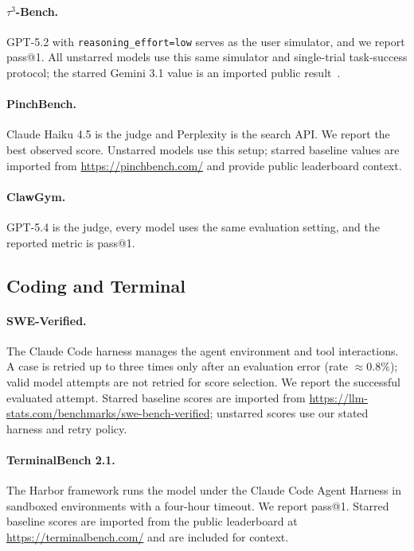 \paragraph{$\tau^3$-Bench.} GPT-5.2 with \texttt{reasoning\_effort=low} serves as the user simulator, and we report pass@1. All unstarred models use this same simulator and single-trial task-success protocol; the starred Gemini 3.1 value is an imported public result~\citep{macaron_v1_preview2026}.

\paragraph{PinchBench.} Claude Haiku 4.5 is the judge and Perplexity is the search API. We report the best observed score. Unstarred models use this setup; starred baseline values are imported from \url{https://pinchbench.com/} and provide public leaderboard context.

\paragraph{ClawGym.} GPT-5.4 is the judge, every model uses the same evaluation setting, and the reported metric is pass@1.

\subsection{Coding and Terminal}

\paragraph{SWE-Verified.} The Claude Code harness manages the agent environment and tool interactions. A case is retried up to three times only after an evaluation error (rate $\approx 0.8\%$); valid model attempts are not retried for score selection. We report the successful evaluated attempt. Starred baseline scores are imported from \url{https://llm-stats.com/benchmarks/swe-bench-verified}; unstarred scores use our stated harness and retry policy.

\paragraph{TerminalBench 2.1.} The Harbor framework runs the model under the Claude Code Agent Harness in sandboxed environments with a four-hour timeout. We report pass@1. Starred baseline scores are imported from the public leaderboard at \url{https://terminalbench.com/} and are included for context.

